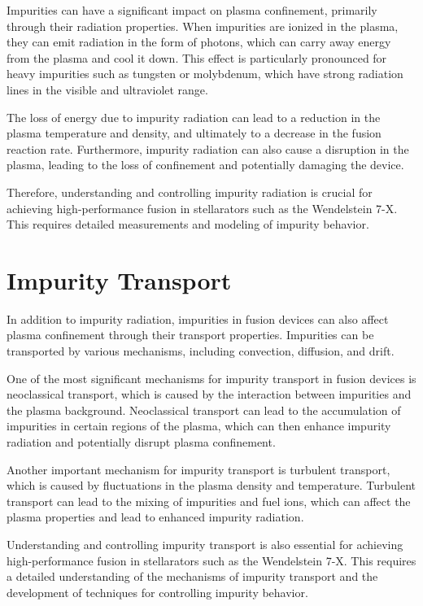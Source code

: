 \documentclass[12pt]{article}
\begin{document}
Impurities can have a significant impact on plasma confinement, primarily through their radiation properties. When impurities are ionized in the plasma, they can emit radiation in the form of photons, which can carry away energy from the plasma and cool it down. This effect is particularly pronounced for heavy impurities such as tungsten or molybdenum, which have strong radiation lines in the visible and ultraviolet range.

The loss of energy due to impurity radiation can lead to a reduction in the plasma temperature and density, and ultimately to a decrease in the fusion reaction rate. Furthermore, impurity radiation can also cause a disruption in the plasma, leading to the loss of confinement and potentially damaging the device.

Therefore, understanding and controlling impurity radiation is crucial for achieving high-performance fusion in stellarators such as the Wendelstein 7-X. This requires detailed measurements and modeling of impurity behavior.

\section{Impurity Transport}

In addition to impurity radiation, impurities in fusion devices can also affect plasma confinement through their transport properties. Impurities can be transported by various mechanisms, including convection, diffusion, and drift.

One of the most significant mechanisms for impurity transport in fusion devices is neoclassical transport, which is caused by the interaction between impurities and the plasma background. Neoclassical transport can lead to the accumulation of impurities in certain regions of the plasma, which can then enhance impurity radiation and potentially disrupt plasma confinement.

Another important mechanism for impurity transport is turbulent transport, which is caused by fluctuations in the plasma density and temperature. Turbulent transport can lead to the mixing of impurities and fuel ions, which can affect the plasma properties and lead to enhanced impurity radiation.

Understanding and controlling impurity transport is also essential for achieving high-performance fusion in stellarators such as the Wendelstein 7-X. This requires a detailed understanding of the mechanisms of impurity transport and the development of techniques for controlling impurity behavior.
\end{document}
